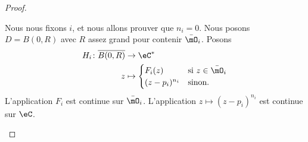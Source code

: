 \begin{proof}
\begin{subproof}
    Nous nous fixons \( i\), et nous allons prouver que \( n_i=0\). Nous posons \( D=B(0,R)\) avec \( R\) assez grand pour contenir \( \bar\mO_i\). Posons
    \begin{equation}
        \begin{aligned}
            H_i\colon \overline{ B(0,R) }&\to \eC^* \\
            z&\mapsto \begin{cases}
                F_i(z)    &   \text{si } z\in\bar\mO_i\\
                (z-p_i)^{n_i}    &    \text{sinon. }
            \end{cases}
        \end{aligned}
    \end{equation}
    L'application \( F_i\) est continue sur \( \bar\mO_i\). L'application \( z\mapsto (z-p_i)^{n_i}\) est continue sur \( \eC\). 


\end{subproof}
\end{proof}

